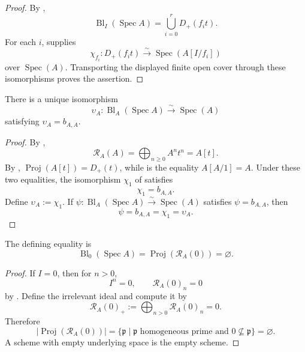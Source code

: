\begin{proof}
  By ,
  \[
    \operatorname{Bl}_I(\operatorname{Spec}A)
      =\bigcup_{i=0}^rD_+(f_it).
  \]
  For each $i$,  supplies
  \[
    \chi_{f_i}\colon D_+(f_it)
      \xrightarrow{\sim}\operatorname{Spec}(A[I/f_i])
  \]
  over $\operatorname{Spec}(A)$.  Transporting the displayed finite open
  cover through these isomorphisms proves the assertion.
\end{proof}

\begin{lemma}
  \label{lemma:nagata-affine-blowup-top}

  There is a unique isomorphism
  \[
    \upsilon_A\colon
      \operatorname{Bl}_{A}(\operatorname{Spec}A)
      \xrightarrow{\sim}\operatorname{Spec}(A)
  \]
  satisfying $\upsilon_A=b_{A,A}$.
\end{lemma}

\begin{proof}
  By ,
  \[
    \mathcal R_A(A)=\bigoplus_{n\ge0}A^nt^n=A[t].
  \]
  By ,
  $\operatorname{Proj}(A[t])=D_+(t)$, while
   is the equality $A[A/1]=A$.  Under
  these two equalities, the isomorphism $\chi_1$ of
   satisfies
  \[
    \chi_1=b_{A,A}.
  \]
  Define $\upsilon_A:=\chi_1$.  If
  $\psi\colon\operatorname{Bl}_{A}(\operatorname{Spec}A)
  \xrightarrow{\sim}\operatorname{Spec}(A)$ satisfies
  $\psi=b_{A,A}$, then
  \[
    \psi=b_{A,A}=\chi_1=\upsilon_A.
  \]
\end{proof}

\begin{lemma}
  \label{lemma:nagata-affine-blowup-bot}

  The defining equality is
  \[
    \operatorname{Bl}_{0}(\operatorname{Spec}A)
      =\operatorname{Proj}(\mathcal R_A(0))=\varnothing.           \tag{R0I0}
  \]
\end{lemma}

\begin{proof}
  If $I=0$, then for $n>0$,
  \[
    I^n=0,
    \qquad \mathcal R_A(0)_n=0
  \]
  by .  Define the irrelevant ideal
  and compute it by
  \[
    \mathcal R_A(0)_+:=\bigoplus_{n>0}\mathcal R_A(0)_n=0.
  \]
  Therefore
  \[
    |\operatorname{Proj}(\mathcal R_A(0))|
      =\{\mathfrak p\mid \mathfrak p\text{ homogeneous prime and }
        0\nsubseteq\mathfrak p\}=\varnothing.
  \]
  A scheme with empty underlying space is the empty scheme.
\end{proof}

